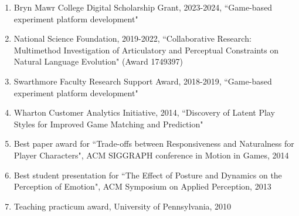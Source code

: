 \begin{enumerate}[leftmargin=*]

\item Bryn Mawr College Digital Scholarship Grant, 2023-2024, ``Game-based experiment platform development"

\item National Science Foundation, 2019-2022, 
``Collaborative Research: Multimethod Investigation of Articulatory and Perceptual Constraints on Natural Language Evolution" (Award 1749397)

\item Swarthmore Faculty Research Support Award, 2018-2019, ``Game-based experiment platform development"

\item Wharton Customer Analytics Initiative, 2014, ``Discovery of Latent Play Styles for Improved Game Matching and Prediction"

\item Best paper award for ``Trade-offs between Responsiveness and Naturalness for Player Characters", ACM SIGGRAPH conference in Motion in Games, 2014

\item Best student presentation for ``The Effect of Posture and Dynamics on the Perception of Emotion", ACM Symposium on Applied Perception, 2013

\item Teaching practicum award, University of Pennsylvania, 2010
\end{enumerate}


